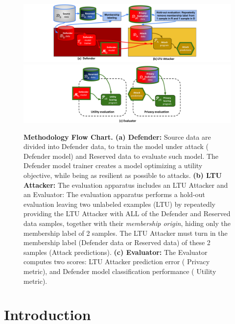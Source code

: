 \documentclass[letterpaper]{article}
\begin{document}
\begin{figure}[!h]
\begin{centering}
  \includegraphics[width=\textwidth]{Figures/flowchart_part1.pdf} \\
  \includegraphics[width=\textwidth]{Figures/flowchart_part2.pdf}
  \caption{{\bf Methodology Flow Chart. (a) Defender:} Source data are divided into {\color{red} Defender data}, to train the model under attack ({\color{red} Defender model}) and {\color{blue} Reserved data} to evaluate such model. The {\color{red} Defender model trainer} creates a model optimizing a utility objective, while being as resilient as possible to attacks. {\bf (b) LTU Attacker:} The evaluation apparatus includes an {\color{orange} LTU Attacker} and an {\color{teal} Evaluator}: The evaluation apparatus performs a hold-out evaluation leaving two unlabeled examples (LTU) by repeatedly providing the {\color{orange} LTU Attacker} with ALL of the {\color{red} Defender} and {\color{blue} Reserved} data samples, together with their {\em membership origin}, hiding only the membership label of 2 samples. The {\color{orange} LTU Attacker} must turn in the membership label (Defender data or Reserved data) of these 2 samples (Attack predictions). {\bf (c) Evaluator:} The {\color{teal} Evaluator} computes two scores: {\color{orange} LTU Attacker} prediction error ({\color{teal} Privacy metric}), and {\color{red} Defender model} classification performance ({\color{teal} Utility metric}).}
  \label{fig:teaser}
  \end{centering}
\end{figure}



\section{Introduction}
\end{document}
